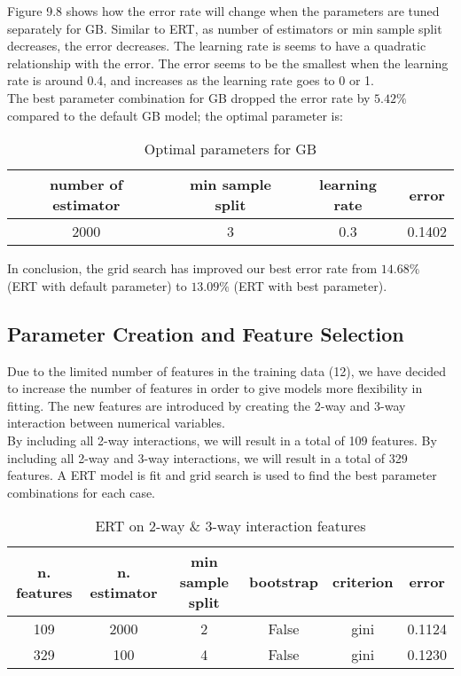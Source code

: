 \documentclass[11pt]{article}
\begin{document}
\noindent Figure 9.8 shows how the error rate will change when the parameters are tuned separately for GB. Similar to ERT, as number of estimators or min sample split decreases, the error decreases. The learning rate is seems to have a quadratic relationship with the error. The error seems to be the smallest when the learning rate is around 0.4, and increases as the learning rate goes to 0 or 1. \\


\noindent The best parameter combination for GB dropped the error rate by $5.42\%$ compared to the default GB model; the optimal parameter is:

\begin{table}[ht]
    \label{best_gb}
    \centering
    \begin{tabular}{c|c|c|c}
        \hline
        \textbf{number of estimator} & \textbf{min sample split} & \textbf{learning rate} & \textbf{error} \\ \hline
        2000 & 3 & 0.3 & 0.1402 \\
        \hline
    \end{tabular}
    \caption{Optimal parameters for GB}
\end{table}

\noindent In conclusion, the grid search has improved our best error rate from $14.68\%$ (ERT with default parameter) to $13.09\%$ (ERT with best parameter).

\subsection{Parameter Creation and Feature Selection}
Due to the limited number of features in the training data (12), we have decided to increase the number of features in order to give models more flexibility in fitting. The new features are introduced by creating the 2-way and 3-way interaction between numerical variables.\\

\noindent By including all 2-way interactions, we will result in a total of 109 features. By including all 2-way and 3-way interactions, we will result in a total of 329 features. A ERT model is fit and grid search is used to find the best parameter combinations for each case.

\begin{table}[ht]
    \label{interaction_both}
    \centering
    \begin{tabular}{c|c c c c|c}
        \hline
        \textbf{n. features} & \textbf{n. estimator} & \textbf{min sample split} & \textbf{bootstrap} & \textbf{criterion} & \textbf{error} \\ \hline
        109 & 2000 & 2 & False & gini & 0.1124 \\
        329 & 100 & 4 & False & gini & 0.1230 \\
        \hline
    \end{tabular}
    \caption{ERT on 2-way $\&$ 3-way interaction features}
\end{table}
\end{document}
